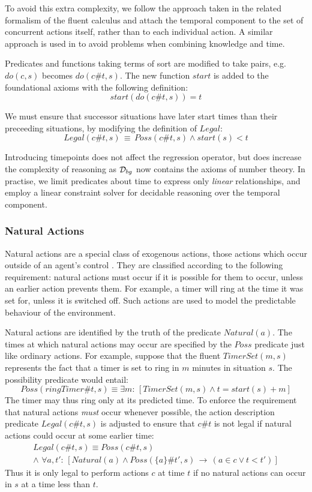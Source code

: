 To avoid this extra complexity, we follow the approach taken in the
related formalism of the fluent calculus \citep{martin03conc_flux}
and attach the temporal component to the set of concurrent actions
itself, rather than to each individual action. A similar approach
is used in \citep{scherl03conc_knowledge} to avoid problems when
combining knowledge and time.

Predicates and functions taking terms of sort  are modified
to take  pairs, e.g. $do(c,s)$ becomes
$do(c\#t,s)$. The new function $start$ is added to the foundational
axioms with the following definition:\[
start(do(c\#t,s))=t\]


We must ensure that successor situations have later start times than
their preceeding situations, by modifying the definition of $Legal$:\[
Legal(c\#t,s)\,\equiv\, Poss(c\#t,s)\wedge start(s)<t\]


Introducing timepoints does not affect the regression operator, but
does increase the complexity of reasoning as $\mathcal{D}_{bg}$ now contains
the axioms of number theory. In practise, we limit predicates about
time to express only \emph{linear} relationships, and employ a linear
constraint solver for decidable reasoning over the temporal component.


\subsubsection{Natural Actions\label{sub:Background:Natural-Actions}}

Natural actions are a special class of exogenous actions, those actions
which occur outside of an agent's control \citep{reiter96sc_nat_conc}.
They are classified according to the following requirement: natural
actions must occur if it is possible for them to occur, unless an
earlier action prevents them. For example, a timer will ring at the
time it was set for, unless it is switched off. Such actions are used
to model the predictable behaviour of the environment.

Natural actions are identified by the truth of the predicate $Natural(a)$.
The times at which natural actions may occur are specified by the
$Poss$ predicate just like ordinary actions. For example, suppose
that the fluent $TimerSet(m,s)$ represents the fact that a timer
is set to ring in $m$ minutes in situation $s$. The possibility
predicate would entail:\[
Poss(ringTimer\#t,s)\equiv\exists m:\,\left[TimerSet(m,s)\wedge t=start(s)+m\right]\]
 The timer may thus ring only at its predicted time. To enforce the
requirement that natural actions \emph{must} occur whenever possible,
the action description predicate $Legal(c\#t,s)$ is adjusted to ensure
that $c\#t$ is not legal if natural actions could occur at some earlier
time:\begin{multline*}
Legal(c\#t,s)\equiv Poss(c\#t,s)\\
\wedge\,\,\forall a,t':\,\left[Natural(a)\wedge Poss(\{a\}\#t',s)\,\rightarrow\,\left(a\in c\vee t<t'\right)\right]\end{multline*}
 Thus it is only legal to perform actions $c$ at time $t$ if no
natural actions can occur in $s$ at a time less than $t$.


